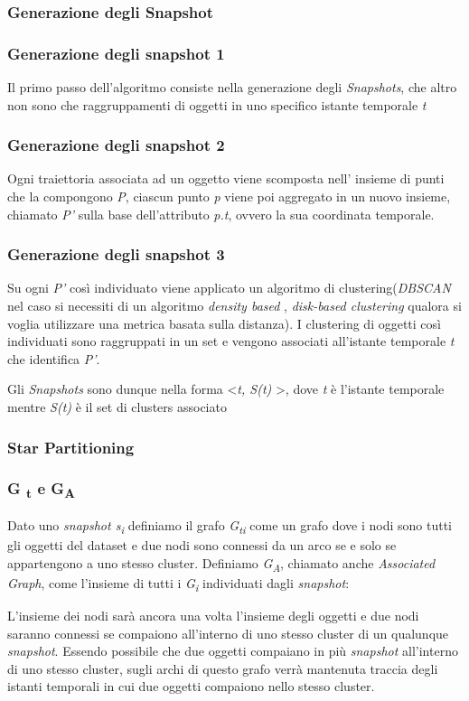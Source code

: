 \documentclass{beamer}
\begin{document}
\subsubsection{Generazione degli Snapshot}

\begin{frame}
	\frametitle{Generazione degli snapshot 1}
	Il primo passo dell'algoritmo consiste nella generazione degli \textit{Snapshots}, che altro non sono che raggruppamenti di oggetti in uno specifico istante temporale \textit{t}
	
\end{frame}

\begin{frame}
	\frametitle{Generazione degli snapshot 2}
	Ogni traiettoria associata ad un oggetto viene scomposta nell' insieme di punti che la compongono \textit{P}, ciascun punto \textit{p} viene poi aggregato in un nuovo insieme, chiamato \textit{P'} sulla base dell'attributo \textit{p.t}, ovvero la sua coordinata temporale.
	
	
\end{frame}

\begin{frame}
	\frametitle{Generazione degli snapshot 3}
	Su ogni \textit{P'} così individuato viene applicato un algoritmo di clustering(\textit{DBSCAN}
	nel caso si necessiti di un algoritmo \textit{density based }, \textit{disk-based clustering} qualora si voglia utilizzare una metrica basata sulla distanza).
	I clustering di oggetti così individuati sono raggruppati in un set e vengono associati all'istante temporale \textit{t} che identifica \textit{P'}.
	
	Gli \textit{Snapshots} sono dunque nella forma \textless \textit{t, S(t)} \textgreater, dove \textit{t} è l'istante temporale mentre \textit{S(t)} è il set di clusters associato 
\end{frame}

\subsubsection{Star Partitioning}

\begin{frame}
	\frametitle{G \textsubscript{t} e G\textsubscript{A}}
Dato uno \textit{snapshot s\textsubscript{i}} definiamo il grafo \textit{G\textsubscript{ti}} come un grafo dove i nodi sono tutti gli oggetti del dataset e due nodi sono connessi da un arco se e solo se appartengono a uno stesso cluster.
Definiamo \textit{G\textsubscript{A}}, chiamato anche \textit{Associated Graph}, come l'insieme di tutti i \textit{G\textsubscript{i}} individuati dagli \textit{snapshot}:

L'insieme dei nodi sarà ancora una volta l'insieme degli oggetti e due nodi saranno connessi se compaiono all'interno di uno stesso cluster di un qualunque \textit{snapshot}.
Essendo possibile che due oggetti compaiano in più \textit{snapshot} all'interno di uno stesso cluster, sugli archi di questo grafo verrà mantenuta traccia degli istanti temporali in cui due oggetti compaiono nello stesso cluster. 
\end{frame}
\end{document}
